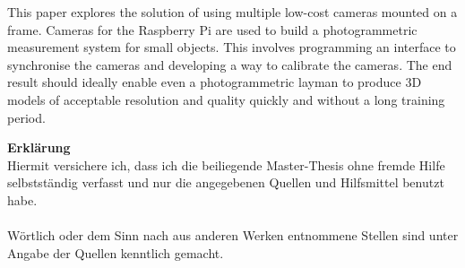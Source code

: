 \documentclass[a4paper,12pt,bibliography=totoc, listof=totoc,titlepage]{scrreprt}
\begin{document}
This paper explores the solution of using multiple low-cost cameras mounted on a frame. Cameras for the Raspberry Pi are used to build a photogrammetric measurement system for small objects. This involves programming an interface to synchronise the cameras and developing a way to calibrate the cameras. The end result should ideally enable even a photogrammetric layman to produce 3D models of acceptable resolution and quality quickly and without a long training period.

\providecommand{\citeTwo}[4]{\citep[{\citealp[#1]{#2};}][#3]{#4}}
\providecommand{\citeThree}[6]{\citep[{\citealp[#1]{#2}; \citealp[#3]{#4};}][#5]{#6}}
\providecommand{\citeFour}[8]{\citep[{\citealp[#1]{#2}; \citealp[#3]{#4}; \citealp[#5]{#6};}][#7]{#8}}

\newpage

\tableofcontents
\newpage

\setcounter{page}{1}















\clearpage
\renewcommand\UrlFont\itshape
\renewcommand{\refname}{Literaturverzeichnis}

\listoffigures
\listoftables


\renewcommand{\appendixpagename}{\appendixname}
\renewcommand{\appendixtocname}{\appendixname}
\begin{appendices}
    
    
\end{appendices}

\newpage
\thispagestyle{empty}
\noindent\textbf{\large Erklärung}\\
Hiermit versichere ich, dass ich die beiliegende Master-Thesis ohne fremde Hilfe selbst\-stän\-dig verfasst und nur die angegebenen Quellen und Hilfsmittel benutzt habe.\\
\\
Wörtlich oder dem Sinn nach aus anderen Werken entnommene Stellen sind unter Angabe der Quellen kenntlich gemacht.
\\
\\
\\
\\
\\
\end{document}
